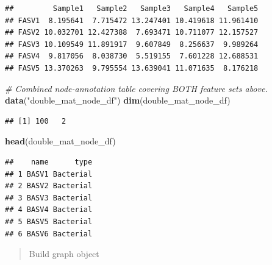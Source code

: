 \documentclass[
]{book}
\newenvironment{Shaded}{\begin{snugshade}}{\end{snugshade}}
\newcommand{\CommentTok}[1]{\textcolor[rgb]{0.56,0.35,0.01}{\textit{#1}}}
\newcommand{\FunctionTok}[1]{\textcolor[rgb]{0.13,0.29,0.53}{\textbf{#1}}}
\newcommand{\NormalTok}[1]{#1}
\newcommand{\StringTok}[1]{\textcolor[rgb]{0.31,0.60,0.02}{#1}}
\begin{document}
\begin{verbatim}
##         Sample1   Sample2   Sample3   Sample4   Sample5
## FASV1  8.195641  7.715472 13.247401 10.419618 11.961410
## FASV2 10.032701 12.427388  7.693471 10.711077 12.157527
## FASV3 10.109549 11.891917  9.607849  8.256637  9.989264
## FASV4  9.817056  8.038730  5.519155  7.601228 12.688531
## FASV5 13.370263  9.795554 13.639041 11.071635  8.176218
\end{verbatim}

\begin{Shaded}
\begin{Highlighting}[]
\CommentTok{\# Combined node{-}annotation table covering BOTH feature sets above.}
\FunctionTok{data}\NormalTok{(}\StringTok{"double\_mat\_node\_df"}\NormalTok{)}
\FunctionTok{dim}\NormalTok{(double\_mat\_node\_df)}
\end{Highlighting}
\end{Shaded}

\begin{verbatim}
## [1] 100   2
\end{verbatim}

\begin{Shaded}
\begin{Highlighting}[]
\FunctionTok{head}\NormalTok{(double\_mat\_node\_df)}
\end{Highlighting}
\end{Shaded}

\begin{verbatim}
##    name      type
## 1 BASV1 Bacterial
## 2 BASV2 Bacterial
## 3 BASV3 Bacterial
## 4 BASV4 Bacterial
## 5 BASV5 Bacterial
## 6 BASV6 Bacterial
\end{verbatim}

\begin{quote}
Build graph object
\end{quote}
\end{document}
